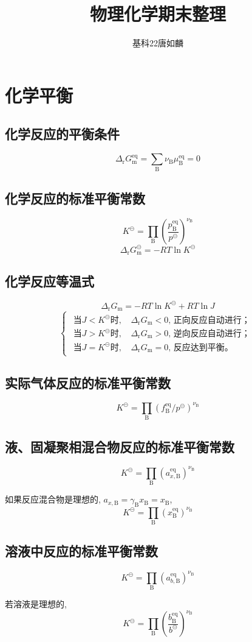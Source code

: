 \documentclass[twocolumn]{article}
\title{物理化学期末整理}
\author{基科22\quad 唐如麟\quad 2012010395}
\newcommand{\equ}[1]{\begin{equation*}#1\end{equation*}}
\newcommand{\drgm}{\Delta_{\mathrm{r}}G_{\rmm}}
\newcommand{\eq}{^{\mathrm{eq}}}
\newcommand{\rmB}{\mathrm{B}}
\newcommand{\rmm}{\mathrm{m}}
\newcommand{\subB}{_{\rmB}}
\newcommand{\std}{^{\circleddash}}
\newcommand{\supnuB}{^{\nu\subB}}
\newcommand{\bstd}{b\std}
\newcommand{\xkh}[1]{\left(#1\right)}
\begin{document}
\maketitle
\raggedend
\setcounter{section}{4} 
\section{化学平衡}
\subsection{化学反应的平衡条件}
\equ{\drgm\eq=\sum\subB\nu\subB\mu\subB\eq=0}
\subsection{化学反应的标准平衡常数}
\equ{K\std=\prod\subB\xkh{\frac{p\subB\eq}{p\std}}\supnuB}
\equ{\drgm\std=-RT\ln K\std}
\subsection{化学反应等温式}
\equ{\drgm=-RT\ln K\std+RT\ln J}
\equ{\begin{cases}\begin{aligned}
\text{当}J<K\std\text{时, }&\drgm<0\text{, 正向反应自动进行；}\\
\text{当}J>K\std\text{时, }&\drgm>0\text{, 逆向反应自动进行；}\\
\text{当}J=K\std\text{时, }&\drgm=0\text{, 反应达到平衡。}
\end{aligned}
\end{cases}}
\subsection{实际气体反应的标准平衡常数}
\equ{K\std=\prod\subB\xkh{f\subB\eq / p \std}\supnuB}
\subsection{液、固凝聚相混合物反应的标准平衡常数}
\equ{K\std=\prod\subB\xkh{a_{x, \rmB}\eq}\supnuB}
\par 如果反应混合物是理想的, $a_{x, \rmB}=\gamma\subB x\subB=x\subB$, 
\equ{K\std=\prod\subB\xkh{x\subB\eq}\supnuB}
\subsection{溶液中反应的标准平衡常数}
\equ{K\std=\prod\subB\xkh{a_{b, \rmB}\eq}\supnuB}
\par 若溶液是理想的, 
\equ{K\std=\prod\subB\xkh{\frac{b\subB\eq}{\bstd}}\supnuB}
\end{document}
